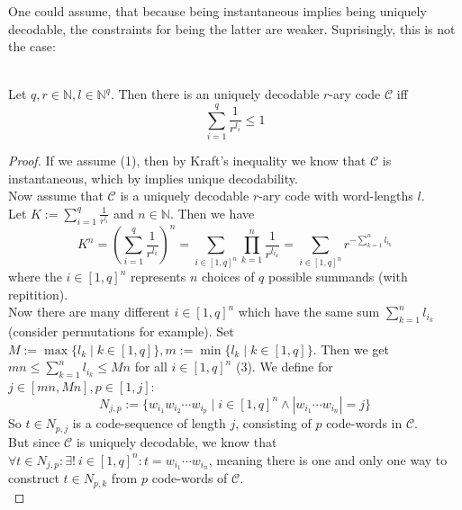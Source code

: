 \documentclass[12pt]{article}
\newenvironment{statement3}[3]{\begin{trivlist}
\item[\hskip \labelsep {\bfseries #1}\hskip \labelsep {\bfseries #2} {#3}\textbf{.}]}{\end{trivlist}}
\begin{document}
One could assume, that because being instantaneous implies being uniquely decodable, the constraints
for being the latter are weaker. Suprisingly, this is not the case:

\begin{statement3}{(1.7)}{Theorem}{(McMillan's Inequality)}\strut\\[2pt]
    Let $q,r \in \mathbb{N}, l \in \mathbb{N}^q$. Then there is an uniquely decodable
    $r$-ary code $\mathcal{C}$ iff
    \begin{equation}
        \sum_{i=1}^{q} \frac{1}{r^{l_i}} \leq 1 \tag{1}
    \end{equation}

    \begin{proof}
        If we assume (1), then by Kraft's inequality we know that $\mathcal{C}$
        is instantaneous, which by \cite{ICT} implies unique decodability.\\[10pt]
        Now assume that $\mathcal{C}$ is a uniquely decodable $r$-ary code with word-lengths
        $l$.\\
        Let
        $
            K := \sum_{i=1}^{q} \frac{1}{r^{l_i}}
        $ and $n \in \mathbb{N}$.
        Then we have
        \begin{equation}
            K^n
            = \left(\sum_{i=1}^{q} \frac{1}{r^{l_i}}\right)^n
            = \sum_{i \in [1,q]^n}\prod_{k=1}^{n} \frac{1}{r^{l_{i_k}}}
            = \sum_{i \in [1,q]^n} r^{-\sum_{k=1}^{n} l_{i_k}} \tag{2}
        \end{equation}
        where the $i \in [1,q]^n$ represents $n$ choices of $q$ possible summands (with repitition).\\[10pt]
        Now there are many different $i \in [1,q]^n$ which have the same sum $\sum_{k=1}^{n} l_{i_k}$
        (consider permutations for example). Set $M := \max\{l_k\mid k \in [1,q]\}, m := \min\{l_k \mid k \in [1,q]\}$.
        Then we get $mn \leq \sum_{k=1}^{n} l_{i_k} \leq Mn$ for all $i \in [1,q]^n$ (3). We define for
        $j \in [mn,Mn], p \in [1,j]$:
        $$
            N_{j,p} := \{w_{i_1}w_{i_2}\cdots w_{i_p} \mid i \in [1,q]^n \land |w_{i_1}\cdots w_{i_n}| = j \}
        $$
        So $t \in N_{p,j}$ is a code-sequence of length $j$, consisting of $p$ code-words in $\mathcal{C}$.\\
        But since $\mathcal{C}$ is uniquely decodable, we know that
        $
            \forall t \in N_{j,p}: \exists!\ i \in [1,q]^n: t = w_{i_1}\cdots w_{i_n}
        $,
        meaning there is one and only one way to construct $t \in N_{p,k}$ from $p$ code-words of $\mathcal{C}$.\\

\end{proof}
\end{statement3}
\end{document}
